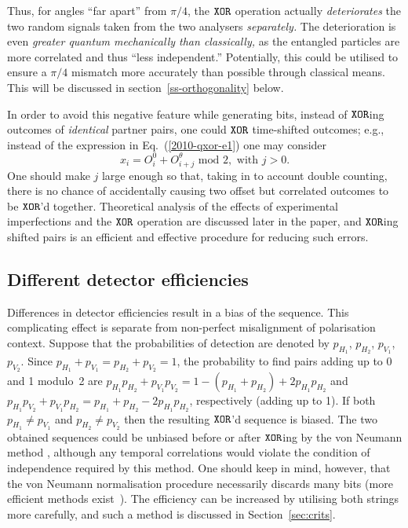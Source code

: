 \documentclass{mscs}
\begin{document}
Thus, for angles ``far apart'' from $\pi /4$, the ${\tt XOR}$ operation actually {\em deteriorates} the two random signals taken from the two analysers {\em separately.}
The deterioration is even {\em greater quantum mechanically than classically,} as the entangled particles are more correlated and thus ``less independent.''
Potentially, this could be utilised to ensure a $\pi/4$ mismatch more accurately than possible through classical means.
This will be discussed in section~\ref{ss-orthogonality} below.

In order to avoid this negative feature while generating bits, instead of ${\tt XOR}$ing outcomes of {\em identical} partner pairs, one could ${\tt XOR}$  time-shifted outcomes; e.g., instead of the expression in Eq.~(\ref{2010-qxor-e1})
one may consider
\begin{equation}
x_i=O^0_i + O^\theta _{i+j} \text{ mod }2, \text{ with } j> 0.
\label{2010-qxor-e2}
\end{equation}
One should make $j$ large enough so that, taking in to account double counting, there is no chance of accidentally causing two offset but correlated outcomes to be ${\tt XOR}$'d together. Theoretical analysis of the effects of experimental imperfections and the ${\tt XOR}$ operation are discussed later in the paper, and ${\tt XOR}$ing shifted pairs is an efficient and effective procedure for reducing such errors.

\subsection{Different detector efficiencies}

Differences in detector efficiencies result in a bias of the sequence. This  complicating effect is separate from non-perfect misalignment of polarisation context.
Suppose that the probabilities of detection are denoted by
$p_{H_1}$,
$p_{H_2}$,
$p_{V_1}$,
$p_{V_2}$. Since  $p_{H_1}+p_{V_1}=p_{H_2}+p_{V_2}=1$,
the probability to find pairs adding up to 0 and 1 modulo~2 are
$p_{H_1}p_{H_2}+ p_{V_1}p_{V_2}=1 - (p_{H_1}+p_{H_2}) + 2p_{H_1}p_{H_2}$
and
$p_{H_1}p_{V_2}+ p_{V_1}p_{H_2}=p_{H_1}+p_{H_2} - 2p_{H_1}p_{H_2}$, respectively (adding up to 1). If both $p_{H_1}\neq p_{V_1}$ and $p_{H_2}\neq p_{V_2}$ then the resulting ${\tt XOR}$'d sequence is biased. The two obtained sequences could be unbiased before or after ${\tt XOR}$ing by the von Neumann method \citep[p. 768]{von-neumann1}, although any temporal correlations would violate the condition of independence required by this method. One should keep in mind, however, that the von Neumann normalisation procedure necessarily discards many bits (more efficient methods exist~\citep{PeresY-1992}). The efficiency can be increased by utilising both strings more carefully, and such a method is discussed in Section~\ref{sec:crits}.
\end{document}

